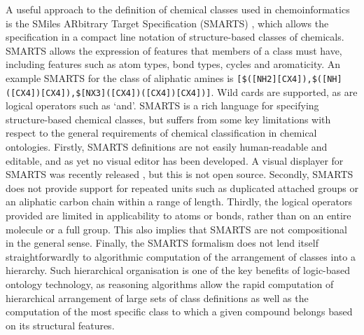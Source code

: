 \documentclass[10pt]{bmc_article}
\newenvironment{bmcformat}{\baselineskip20pt\sloppy\setboolean{publ}{false}}{\baselineskip20pt\sloppy}
\begin{document}
\begin{bmcformat}



A useful approach to the definition of chemical classes used in chemoinformatics is the SMiles ARbitrary Target Specification (SMARTS) \cite{smarts2011}, which allows the specification in a compact line notation of structure-based classes of chemicals. SMARTS allows the expression of features that members of a class must have, including features such as atom types, bond types, cycles and aromaticity. An example SMARTS for the class of aliphatic amines is \texttt{[\$([NH2][CX4]),\$([NH]([CX4])[CX4]),\$[NX3]([CX4])([CX4])[CX4])]}. Wild cards are supported, as are logical operators such as `and'. SMARTS is a rich language for specifying structure-based chemical classes, but suffers from some key limitations with respect to the general requirements of chemical classification in chemical ontologies. Firstly, SMARTS definitions are not easily human-readable and editable, and as yet no visual editor has been developed. A visual displayer for SMARTS was recently released \cite{smartsviewer2010}, but this is not open source. Secondly, SMARTS does not provide support for repeated units such as duplicated attached groups or an aliphatic carbon chain within a range of length. Thirdly, the logical operators provided are limited in applicability to atoms or bonds, rather than on an entire molecule or a full group. This also implies that SMARTS are not compositional in the general sense. Finally, the SMARTS formalism does not lend itself straightforwardly to algorithmic computation of the arrangement of classes into a hierarchy. Such hierarchical organisation is one of the key benefits of logic-based ontology technology, as reasoning algorithms allow the rapid computation of hierarchical arrangement of large sets of class definitions as well as the computation of the most specific class to which a given compound belongs based on its structural features. 




\end{bmcformat}
\end{document}
